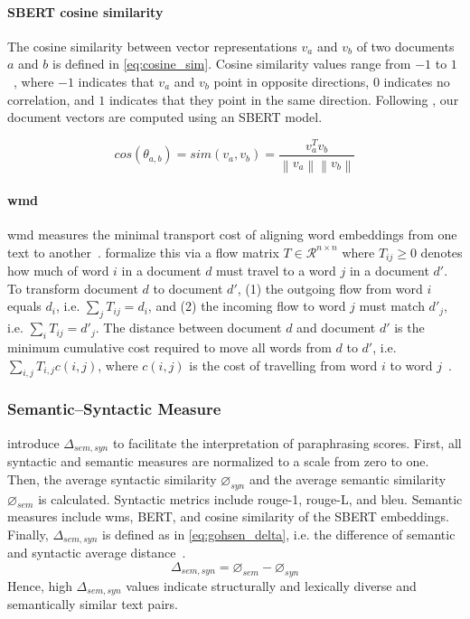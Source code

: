 \paragraph{SBERT cosine similarity}
The cosine similarity between vector representations $v_a$ and $v_b$ of two documents $a$ and $b$ is defined in \autoref{eq:cosine_sim}. 
Cosine similarity values range from $-1$ to $1$~\citep{thongtan_cosine_sim_19,zhang_bertscore_2020}, where $-1$ indicates that $v_a$ and $v_b$ point in opposite directions, $0$ indicates no correlation, and $1$ indicates that they point in the same direction. 
Following \citet{gohsen_captions_2023}, our document vectors are computed using an SBERT model.

\begin{equation}
    cos(\theta_{a,b})=sim(v_a,v_b)=\frac{v_a^Tv_b}{\left\| v_a \right\|\left\| v_b \right\|}
    \label{eq:cosine_sim}
\end{equation}


\paragraph{\ac{wmd}}
\ac{wmd} measures the minimal transport cost of aligning word embeddings from one text to another~\citep{gohsen_captions_2023}. 
\citet{kusner_wmd_15} formalize this via a flow matrix $T \in \mathcal{R}^{n \times n}$ where $T_{ij} \geq 0$ denotes how much of word $i$ in a document $d$ must travel to a word $j$ in a document $d'$.
To transform document $d$ to document $d'$, (1) the outgoing flow from word $i$ equals $d_i$, i.e. $\sum_{j}T_{ij}=d_i$, and (2) the incoming flow to word $j$ must match $d'_j$, i.e. $\sum_{i}T_{ij}=d'_j$.
The distance between document $d$ and document $d'$ is the minimum cumulative cost required to move all words from $d$ to $d'$, i.e. $\sum_{i,j}T_{i,j}c(i,j)$, where $c(i,j)$ is the cost of travelling from word $i$ to word $j$~\citep{kusner_wmd_15}.


\subsubsection{Semantic–Syntactic Measure}

\citet{gohsen_captions_2023} introduce $\Delta_{sem,syn}$ to facilitate the interpretation of paraphrasing scores.
First, all syntactic and semantic measures are normalized to a scale from zero to one.
Then, the average syntactic similarity $\diameter_{syn}$ and the average semantic similarity $\diameter_{sem}$ is calculated.
Syntactic metrics include \ac{rouge}-1, \ac{rouge}-L, and \ac{bleu}.
Semantic measures include \ac{wms}, BERT, and cosine similarity of the SBERT embeddings.
Finally, $\Delta_{sem,syn}$ is defined as in \autoref{eq:gohsen_delta}, i.e. the difference of semantic and syntactic average distance~\citep{gohsen_captions_2023}.
\begin{equation}
    \Delta_{sem,syn}=\diameter_{sem}-\diameter_{syn}
    \label{eq:gohsen_delta}
\end{equation}
Hence, high $\Delta_{sem,syn}$ values indicate structurally and lexically diverse and semantically similar text pairs.
